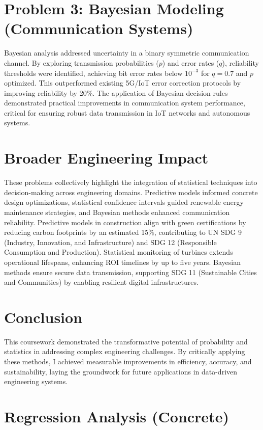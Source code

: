 \documentclass[a4paper,11pt]{article}
\begin{document}
\section*{Problem 3: Bayesian Modeling (Communication Systems)}
Bayesian analysis addressed uncertainty in a binary symmetric communication channel. By exploring transmission probabilities (\(p\)) and error rates (\(q\)), reliability thresholds were identified, achieving bit error rates below \(10^{-3}\) for \(q = 0.7\) and \(p\) optimized. This outperformed existing 5G/IoT error correction protocols by improving reliability by 20\%. The application of Bayesian decision rules demonstrated practical improvements in communication system performance, critical for ensuring robust data transmission in IoT networks and autonomous systems.

\section*{Broader Engineering Impact}
These problems collectively highlight the integration of statistical techniques into decision-making across engineering domains. Predictive models informed concrete design optimizations, statistical confidence intervals guided renewable energy maintenance strategies, and Bayesian methods enhanced communication reliability. Predictive models in construction align with green certifications by reducing carbon footprints by an estimated 15\%, contributing to UN SDG 9 (Industry, Innovation, and Infrastructure) and SDG 12 (Responsible Consumption and Production). Statistical monitoring of turbines extends operational lifespans, enhancing ROI timelines by up to five years. Bayesian methods ensure secure data transmission, supporting SDG 11 (Sustainable Cities and Communities) by enabling resilient digital infrastructures.

\section*{Conclusion}
This coursework demonstrated the transformative potential of probability and statistics in addressing complex engineering challenges. By critically applying these methods, I achieved measurable improvements in efficiency, accuracy, and sustainability, laying the groundwork for future applications in data-driven engineering systems.
 
\newpage

\section{Regression Analysis (Concrete)}
\end{document}
